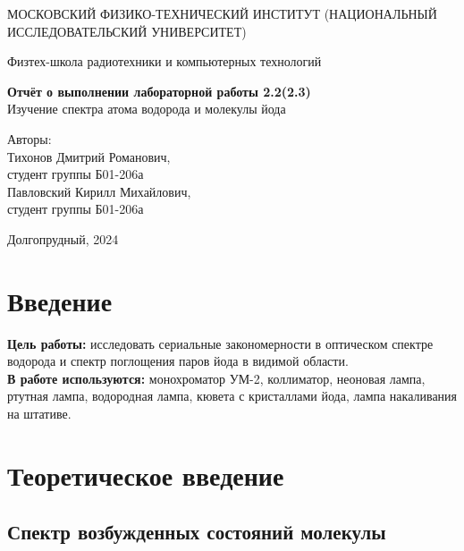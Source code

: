 \documentclass[a4paper, 12pt]{article}
\begin{document}
    \begin{titlepage}
	\begin{center}
            {\large МОСКОВСКИЙ ФИЗИКО-ТЕХНИЧЕСКИЙ ИНСТИТУТ (НАЦИОНАЛЬНЫЙ ИССЛЕДОВАТЕЛЬСКИЙ УНИВЕРСИТЕТ)}
	\end{center}
 
	\begin{center}
		{\large Физтех-школа радиотехники и компьютерных технологий}
	\end{center}
	
	\vspace{8cm}
	{\LARGE
		\begin{center}
                {\bf Отчёт о выполнении лабораторной работы 2.2(2.3)}\\
                Изучение спектра атома водорода и молекулы йода
		\end{center}
	}
	\vspace{3 cm}
	\begin{flushright}
		{\Large Авторы: \\ 
        Тихонов Дмитрий Романович, \\ студент группы Б01-206а \\
        Павловский Кирилл Михайлович, \\ студент группы Б01-206а}
	\end{flushright}
	\vspace{4cm}
	\begin{center}
		\Large Долгопрудный, 2024
	\end{center}
    \end{titlepage}


    \section{Введение}

    \noindent \textbf{Цель работы:} исследовать сериальные закономерности в оптическом спектре водорода и спектр поглощения паров йода в видимой области. \\
	
    \noindent \textbf{В работе используются:} монохроматор УМ-2, коллиматор, неоновая лампа, ртутная лампа, водородная лампа, кювета с кристаллами йода, лампа накаливания на штативе.
    
    \section{Теоретическое введение}

    \subsection{Спектр возбужденных состояний молекулы}
\end{document}
